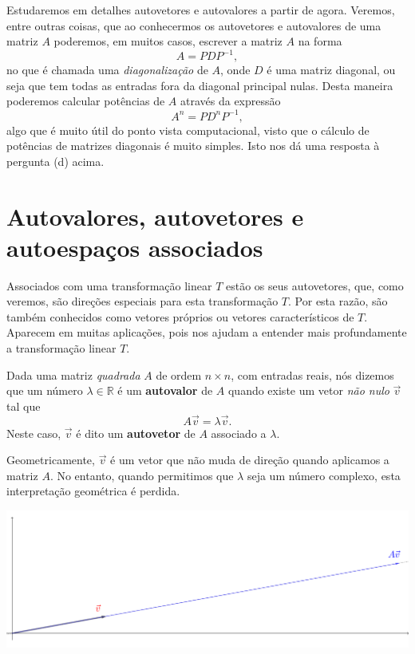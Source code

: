 Estudaremos em detalhes autovetores e autovalores a partir de agora. Veremos, entre outras coisas, que ao conhecermos os autovetores e autovalores de uma matriz $A$
poderemos, em muitos casos, escrever a matriz $A$ na forma
\begin{equation}A = P D P^{-1},\end{equation}
no que é chamada uma {\it diagonalização} de $A$, onde $D$ é uma matriz diagonal, ou seja que tem todas as entradas fora da diagonal principal nulas. Desta maneira poderemos calcular potências de $A$ através da expressão
\begin{equation}A^n = P D^n P^{-1},\end{equation}
algo que é muito útil do ponto vista computacional, visto que o cálculo de potências de matrizes diagonais é muito simples. Isto nos dá uma resposta à pergunta (d) acima.


\section{Autovalores, autovetores e autoespaços associados}


Associados com uma transformação linear $T$ estão os seus autovetores, que, como veremos, são direções especiais para esta transformação $T$. Por esta razão, são também conhecidos como vetores próprios ou vetores característicos de $T$. Aparecem em muitas aplicações, pois nos ajudam a entender mais profundamente a transformação linear $T$.

Dada uma matriz \textit{quadrada} $A$ de ordem $n \times n$, com entradas reais, nós dizemos que um número $\lambda \in \mathbb{R}$ é um \textbf{autovalor} de $A$ quando existe um vetor \textit{não nulo} $\vec{v}$ tal que
\begin{equation}
A \vec{v} = \lambda \vec{v}.
\end{equation} Neste caso, $\vec{v}$ é dito um \textbf{autovetor} de $A$ associado a $\lambda$.

Geometricamente, $\vec{v}$ é um vetor que não muda de direção quando aplicamos a matriz $A$. No entanto, quando permitimos que $\lambda$ seja um número complexo, esta interpretação geométrica é perdida.

		\includegraphics[width=1 \linewidth]{Semana10/semana10-eigen}

